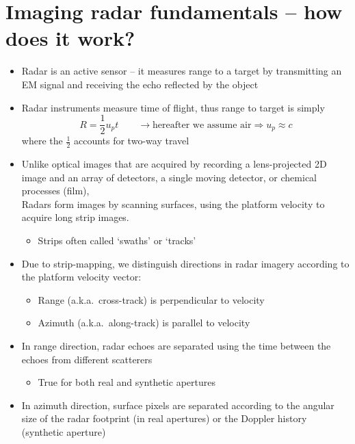 \documentclass[11pt, oneside]{article}
\begin{document}
\section{Imaging radar fundamentals -- how does it work?}
\label{s:fund}

\begin{itemize}
	\item Radar is an active sensor -- it measures range to a target by transmitting an EM signal and receiving the echo reflected by the object
	\item Radar instruments measure time of flight, thus range to target is simply
	\begin{equation}
		\label{e:R}
		R = \frac{1}{2}u_pt \qquad \rightarrow \text{hereafter we assume air} \Rightarrow u_p \approx c
	\end{equation}
	where the $\frac{1}{2}$ accounts for two-way travel
	\item Unlike optical images that are acquired by recording a lens-projected 2D image and an array of detectors, a single moving detector, or chemical processes (film),\\
	Radars form images by scanning surfaces, using the platform velocity to acquire long strip images.
	\begin{itemize}
		\item[$\bigstar$] Strips often called `swaths' or `tracks'
	\end{itemize}
	\item Due to strip-mapping, we distinguish directions in radar imagery according to the platform velocity vector:
	\begin{itemize}
		\item[--] Range (a.k.a.\ cross-track) is perpendicular to velocity
		\item[--] Azimuth (a.k.a.\ along-track) is parallel to velocity
	\end{itemize}
	\item In range direction, radar echoes are separated using the time between the echoes from different scatterers
	\begin{itemize}
		\item[$\bigstar$] True for both real and synthetic apertures
	\end{itemize}
	\item In azimuth direction, surface pixels are separated according to the angular size of the radar footprint (in real apertures) or the Doppler history (synthetic aperture)
\end{itemize}
\end{document}
